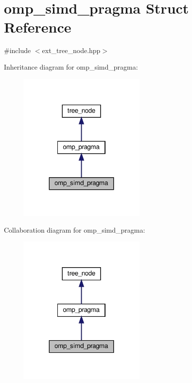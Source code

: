 \hypertarget{structomp__simd__pragma}{}\section{omp\+\_\+simd\+\_\+pragma Struct Reference}
\label{structomp__simd__pragma}


{\ttfamily \#include $<$ext\+\_\+tree\+\_\+node.\+hpp$>$}



Inheritance diagram for omp\+\_\+simd\+\_\+pragma\+:
\nopagebreak
\begin{figure}[H]
\begin{center}
\leavevmode
\includegraphics[width=179pt]{d5/dd1/structomp__simd__pragma__inherit__graph}
\end{center}
\end{figure}


Collaboration diagram for omp\+\_\+simd\+\_\+pragma\+:
\nopagebreak
\begin{figure}[H]
\begin{center}
\leavevmode
\includegraphics[width=179pt]{de/de4/structomp__simd__pragma__coll__graph}
\end{center}
\end{figure}
